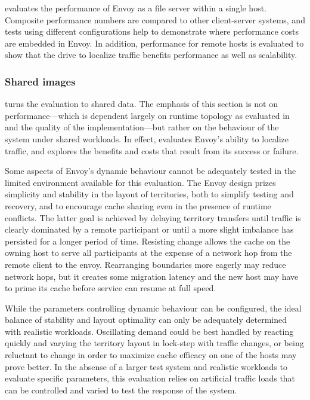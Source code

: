  evaluates the performance of Envoy as a file server within a single host. Composite performance numbers are compared to other client-server systems, and tests using different configurations help to demonstrate where performance costs are embedded in Envoy. In addition, performance for remote hosts is evaluated to show that the drive to localize traffic benefits performance as well as scalability.

\subsubsection{Shared images}

 turns the evaluation to shared data. The emphasis of this section is not on performance---which is dependent largely on runtime topology as evaluated in  and the quality of the implementation---but rather on the behaviour of the system under shared workloads. In effect,  evaluates Envoy's ability to localize traffic, and  explores the benefits and costs that result from its success or failure.

Some aspects of Envoy's dynamic behaviour cannot be adequately tested in the limited environment available for this evaluation. The Envoy design prizes simplicity and stability in the layout of territories, both to simplify testing and recovery, and to encourage cache sharing even in the presence of runtime conflicts. The latter goal is achieved by delaying territory transfers until traffic is clearly dominated by a remote participant or until a more slight imbalance has persisted for a longer period of time. Resisting change allows the cache on the owning host to serve all participants at the expense of a network hop from the remote client to the envoy. Rearranging boundaries more eagerly may reduce network hops, but it creates some migration latency and the new host may have to prime its cache before service can resume at full speed.

While the parameters controlling dynamic behaviour can be configured, the ideal balance of stability and layout optimality can only be adequately determined with realistic workloads. Oscillating demand could be best handled by reacting quickly and varying the territory layout in lock-step with traffic changes, or being reluctant to change in order to maximize cache efficacy on one of the hosts may prove better. In the absense of a larger test system and realistic workloads to evaluate specific parameters, this evaluation relies on artificial traffic loads that can be controlled and varied to test the response of the system.

